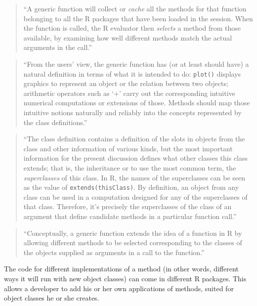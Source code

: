 \documentclass[]{tufte-book}
\begin{document}
\begin{quote}
``A generic function will collect or \emph{cache} all the methods for that function
belonging to all the R packages that have been loaded in the session. When the
function is called, the R evaluator then \emph{selects} a method from those available,
by examining how well different methods match the actual arguments in the call.''
\citep{chambers2006s4}
\end{quote}

\begin{quote}
``From the users' view, the generic function has (or at least should have) a
natural definition in terms of what it is intended to do: \texttt{plot()} displays
graphics to represent an object or the relation between two objects; arithmetic
operators such as `+' carry out the corresponding intuitive numerical
computations or extensions of those. Methods should map those intuitive notions
naturally and reliably into the concepts represented by the class definitions.''
\citep{chambers2006s4}
\end{quote}

\begin{quote}
``The class definition contains a definition of the slots in objects from the
class and other information of various kinds, but the most important information
for the present discussion defines what other classes this class extends; that
is, the inheritance or to use the most common term, the \emph{superclasses} of this
class. In R, the names of the superclasses can be seen as the value of
\texttt{extends(thisClass)}. By definition, an object from any class can be used in a
computation designed for any of the superclasses of that class. Therefore, it's
precisely the superclasses of the class of an argument that define candidate
methods in a particular function call.'' \citep{chambers2006s4}
\end{quote}

\begin{quote}
``Conceptually, a generic function extends the idea of a function in R by
allowing different methods to be selected corresponding to the classes of the
objects supplied as arguments in a call to the function.'' \citep{chambers2006s4}
\end{quote}

The code for different implementations of a method (in other words, different
ways it will run with new object classes) can come in different R packages.
This allows a developer to add his or her own applications of methods, suited
for object classes he or she creates.
\end{document}
